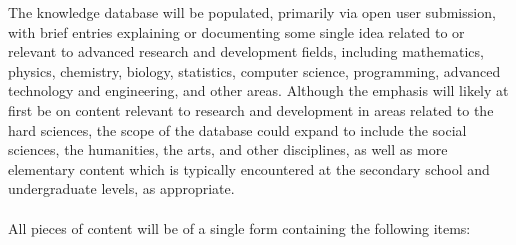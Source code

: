 \documentclass[12pt,letterpaper]{article}
\begin{document}
The knowledge database will be populated, primarily via open user submission, with brief entries explaining or documenting some single idea related to or relevant to advanced research and development fields, including mathematics, physics, chemistry, biology, statistics, computer science, programming, advanced technology and engineering, and other areas. Although the emphasis will likely at first be on content relevant to research and development in areas related to the hard sciences, the scope of the database could expand to include the social sciences, the humanities, the arts, and other disciplines, as well as more elementary content which is typically encountered at the secondary school and undergraduate levels, as appropriate.
\\
\\
All pieces of content will be of a single form containing the following items:
\end{document}
